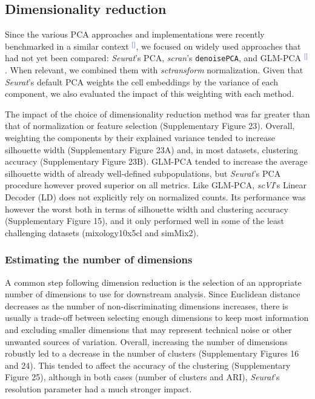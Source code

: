 \documentclass[11pt]{article}
\renewcommand{\cite}[1]{\textcolor{Blue}{$^[$\supercite{#1}$^]$}}
\begin{document}
\subsection*{Dimensionality reduction}

Since the various PCA approaches and implementations were recently benchmarked in a similar context \cite{TsuyuzakiPCA2020}, we focused on widely used approaches that had not yet been compared: \textit{Seurat}'s PCA, \textit{scran}'s \texttt{denoisePCA}, and GLM-PCA \cite{townesGlmpca2019}. When relevant, we combined them with \textit{sctransform} normalization. Given that \textit{Seurat}'s default PCA weights the cell embeddings by the variance of each component, we also evaluated the impact of this weighting with each method.

The impact of the choice of dimensionality reduction method was far greater than that of normalization or feature selection (Supplementary Figure 23). {\color{red}Overall, weighting the components by their explained variance tended to increase silhouette width (Supplementary Figure 23A) and, in most datasets, clustering accuracy (Supplementary} Figure 23B). GLM-PCA tended to increase the average silhouette width of already well-defined subpopulations, but \textit{Seurat}'s PCA procedure however proved superior on all metrics. Like GLM-PCA, \textit{scVI}'s Linear Decoder (LD) does not explicitly rely on normalized counts. {\color{red}Its performance was however the worst both in terms of silhouette width and clustering accuracy (Supplementary Figure 15), and it only performed well in some of the least challenging datasets (mixology10x5cl and simMix2).}

\subsubsection*{Estimating the number of dimensions}

A common step following dimension reduction is the selection of an appropriate number of dimensions to use for downstream analysis. Since Euclidean distance decreases as the number of non-discriminating dimensions increases, there is usually a trade-off between selecting enough dimensions to keep most information and excluding smaller dimensions that may represent technical noise or other unwanted sources of variation. Overall, increasing the number of dimensions robustly led to a decrease in the number of clusters (Supplementary Figures 16 and 24). This tended to affect the accuracy of the clustering (Supplementary Figure 25), although in both cases (number of clusters and ARI), \textit{Seurat}'s resolution parameter had a much stronger impact.
\end{document}
